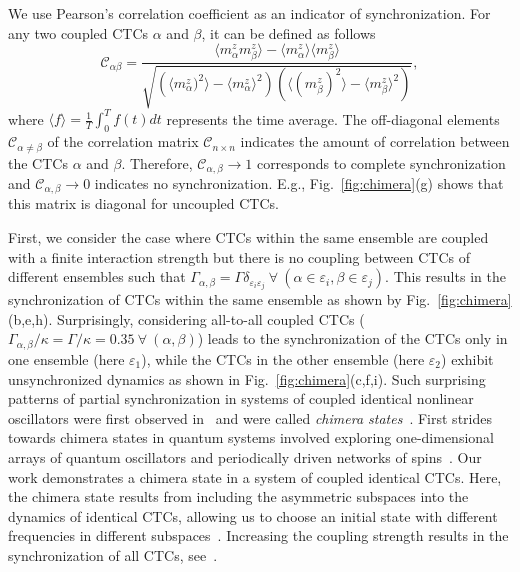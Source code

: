 \documentclass[pra,aps,twocolumn,superscriptaddress,notitlepage]{revtex4-1}
\begin{document}
	
	We use Pearson’s correlation coefficient as an indicator of synchronization. For any two coupled CTCs $\alpha$ and $\beta$, it can be defined as follows
	\begin{equation}
	\mathcal{C}_{\alpha \beta} = \frac{\langle{m^{z}_{\alpha} m^{z}_{\beta}}\rangle- \langle{m^{z}_{\alpha}}\rangle \langle{m^{z}_{\beta}}\rangle}
	{\sqrt{(\langle{m^{z}_{\alpha})^{2}}\rangle- \langle{m^{z}_{\alpha}}\rangle ^{2}) (\langle{(m^{z}_{\beta})^{2}}\rangle- \langle{m^{z}_{\beta}}\rangle ^{2})}},
	\end{equation}
	where $\langle f \rangle = \frac{1}{T}\int_0^{T}f(t)dt$ represents the time average.
	The off-diagonal elements $\mathcal{C}_{\alpha\neq\beta}$ of the correlation matrix $\mathcal{C}_{n \times n}$ indicates the amount of correlation between the CTCs $\alpha$ and $\beta$.
	Therefore, $\mathcal{C}_{\alpha,\beta}\rightarrow 1$ corresponds to complete synchronization and $\mathcal{C}_{\alpha,\beta}\rightarrow 0$  indicates no synchronization. E.g., Fig.~\ref{fig:chimera}(g) shows that this matrix is diagonal for uncoupled CTCs.
	
	
	First, we consider the case where CTCs within the same ensemble are coupled with a finite interaction strength but there is no coupling between CTCs of different ensembles such that $\Gamma_{\alpha,\beta}=\Gamma \delta_{\varepsilon_i \varepsilon_j} ~\forall~( \alpha \in \varepsilon_i, \beta \in \varepsilon_j)$.
	This results in the synchronization of CTCs within the same ensemble as shown by Fig.~\ref{fig:chimera}(b,e,h).
	Surprisingly, considering all-to-all coupled CTCs ($\Gamma_{\alpha,\beta}/\kappa=\Gamma/\kappa=0.35~ \forall ~(\alpha,\beta)$) leads to the synchronization of the CTCs only in one ensemble (here $\varepsilon_1$), while the CTCs in the other ensemble (here $\varepsilon_2$) exhibit unsynchronized dynamics as shown in Fig.~\ref{fig:chimera}(c,f,i).
	Such surprising patterns of partial synchronization in systems of coupled identical nonlinear oscillators were first observed in~\cite{kuramoto2002coexistence} and were called \textit{chimera states}~\cite{Abrams2004,zakharova_book}. 
	First strides towards chimera states in quantum systems involved exploring one-dimensional arrays of quantum oscillators \cite{bastidas2015chimera} and periodically driven networks of spins~\cite{sakurai2021chimera}.
	Our work demonstrates a chimera state in a system of coupled identical CTCs.
	Here, the chimera state results from including the asymmetric subspaces into the dynamics of identical CTCs, allowing us to choose an initial state with different frequencies in different subspaces~\cite{ujjwal2017chimera}.
	Increasing the coupling strength results in the synchronization of all CTCs, see~\cite{supp}.
	
\end{document}
